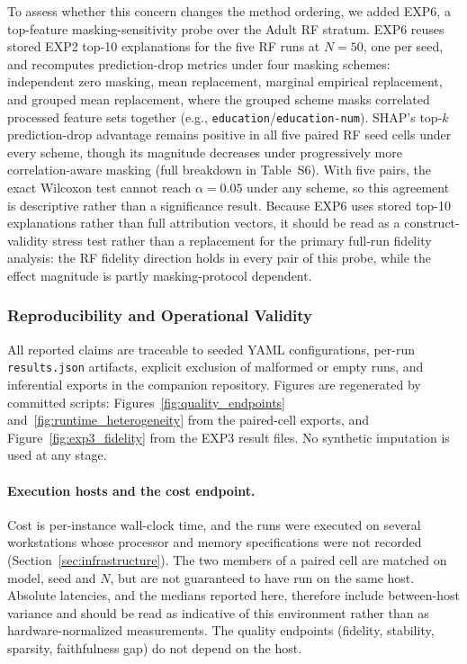 \documentclass[fleqn,10pt,lineno]{wlpeerj}
\begin{document}
To assess whether this concern changes the method ordering, we added EXP6,
a top-feature masking-sensitivity probe over the Adult RF stratum. EXP6
reuses stored EXP2 top-10 explanations for the five RF runs at $N=50$,
one per seed, and recomputes prediction-drop metrics under four masking schemes:
independent zero masking, mean replacement, marginal empirical replacement,
and grouped mean replacement, where the grouped scheme masks correlated
processed feature sets together (e.g.,
\texttt{education}/\texttt{education-num}). SHAP's top-$k$ prediction-drop
advantage remains positive in all five paired RF seed cells under every
scheme, though its magnitude decreases under progressively more
correlation-aware masking (full breakdown in Table~S6). With five pairs, the exact Wilcoxon test cannot reach
$\alpha = 0.05$ under any scheme, so this agreement is descriptive rather
than a significance result. Because EXP6 uses stored top-10 explanations rather than full
attribution vectors, it should be read as a construct-validity stress test
rather than a replacement for the primary full-run fidelity analysis: the
RF fidelity direction holds in every pair of this probe, while the effect magnitude
is partly masking-protocol dependent.

\subsubsection{Reproducibility and Operational Validity}

All reported claims are traceable to seeded YAML configurations, per-run
\texttt{results.json} artifacts, explicit exclusion of malformed or empty
runs, and inferential exports in the companion repository. Figures are
regenerated by committed scripts: Figures~\ref{fig:quality_endpoints}
and~\ref{fig:runtime_heterogeneity} from the paired-cell exports, and
Figure~\ref{fig:exp3_fidelity} from the EXP3 result files. No synthetic
imputation is used at any stage.

\paragraph{Execution hosts and the cost endpoint.} Cost is per-instance
wall-clock time, and the runs were executed on several workstations whose
processor and memory specifications were not recorded
(Section~\ref{sec:infrastructure}). The two members of a paired cell are
matched on model, seed and $N$, but are not guaranteed to have run on the
same host. Absolute latencies, and the medians reported here, therefore
include between-host variance and should be read as indicative of this
environment rather than as hardware-normalized measurements. The quality
endpoints (fidelity, stability, sparsity, faithfulness gap) do not depend on
the host.
\end{document}
